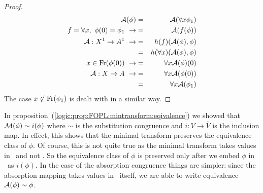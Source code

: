 \begin{proof}
    \begin{eqnarray*}
    {\cal A}(\phi)&=&{\cal A}(\forall x\phi_{1})\\
    f=\forall x,\ \phi(0)=\phi_{1}\ \rightarrow
    &=&{\cal A}(f(\phi))\\
    {\cal A}:X^{1}\to A^{1}\ \rightarrow
    &=&h(f)({\cal A}(\phi),\phi)\\
    &=&h(\forall x)({\cal A}(\phi),\phi)\\
    x\in\mbox{\rm Fr}(\phi(0))\ \rightarrow
    &=&\forall x{\cal A}(\phi)(0)\\
    {\cal A}:X\to A\ \rightarrow
    &=&\forall x{\cal A}(\phi(0))\\
    &=&\forall x{\cal A}(\phi_{1})\\
    \end{eqnarray*}
The case $x\not\in\mbox{\rm Fr}(\phi_{1})$ is dealt with in a similar way.
\end{proof}

In proposition~(\ref{logic:prop:FOPL:mintransform:eqivalence}) we
showed that ${\cal M}(\phi)\sim i(\phi)$ where $\sim$ is the
substitution congruence and $i:V\to\bar{V}$ is the inclusion map. In
effect, this shows that the minimal transform preserves the
equivalence class of $\phi$. Of course, this is not quite true as
the minimal transform takes values in \pvb\ and not \pv. So the
equivalence class of $\phi$ is preserved only after we embed $\phi$
in \pvb\ as $i(\phi)$. In the case of the absorption congruence
things are simpler: since the absorption mapping takes values in
\pv\ itself, we are able to write equivalence ${\cal
A}(\phi)\sim\phi$.

